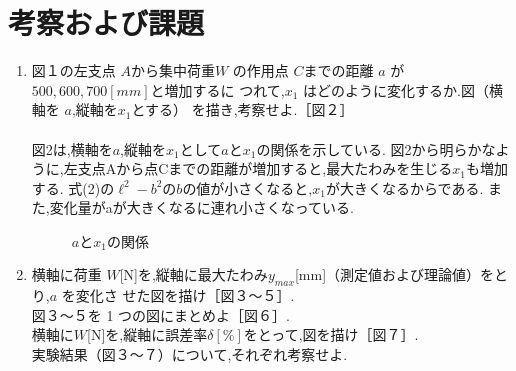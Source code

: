 \documentclass[a4paper,11pt]{jsarticle}
\begin{document}
\section{考察および課題}
\begin{enumerate}
  \item 図１の左支点 $A$から集中荷重$ W$ の作用点 $C $までの距離 $a$ が $500,600,700 [mm]$と増加するに
        つれて,$x_1$ はどのように変化するか.図（横軸を $a $,縦軸を$x_1$とする） を描き,考察せよ.［図２］\\
        \\
        \quad 図2は,横軸を$a$,縦軸を$x_1$として$a$と$x_1$の関係を示している.
        図2から明らかなように,左支点Aから点Cまでの距離が増加すると,最大たわみを生じる$x_1$も増加する.
        式(2)の$\ell^2-b^2$の$b$の値が小さくなると,$x_1$が大きくなるからである.
        また,変化量がaが大きくなるに連れ小さくなっている.

        \clearpage
        \begin{figure}[h]
          \centering
          \caption{$a$と$x_1$の関係}
        \end{figure}
        \clearpage

  \item 横軸に荷重 $W $[N]を,縦軸に最大たわみ$ y_{max}$[mm]（測定値および理論値）をとり,$a$ を変化さ
        せた図を描け［図３～５］.\\
        図３～５を 1 つの図にまとめよ［図６］.\\
        横軸に$ W $[N]を,縦軸に誤差率$ \delta [\%]$をとって,図を描け［図７］.\\
        実験結果（図３～７）について,それぞれ考察せよ.\\


\end{enumerate}
\end{document}
